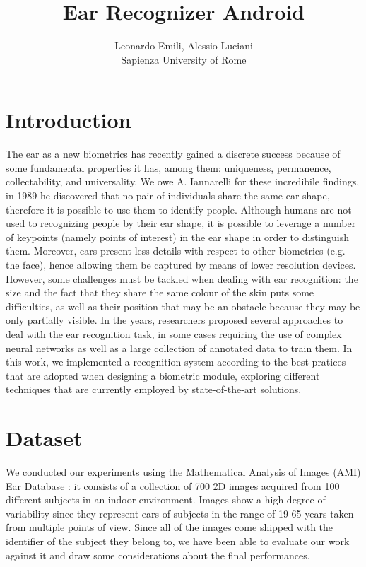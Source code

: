 \documentclass{article}
\begin{document}
\title{Ear Recognizer Android}
\author{Leonardo Emili, Alessio Luciani\\
Sapienza University of Rome}
\renewcommand{\today}{February, 2021}
\maketitle

\section{Introduction}

The ear as a new biometrics has recently gained a discrete success because of some fundamental properties it has,
among them: uniqueness, permanence, collectability, and universality.
We owe A. Iannarelli for these incredibile findings, in 1989 he discovered that no pair of individuals
share the same ear shape, therefore it is possible to use them to identify people. Although humans are
not used to recognizing people by their ear shape, it is possible to leverage a number of keypoints
(namely points of interest) in the ear shape in order to distinguish them. Moreover, ears present
less details with respect to other biometrics (e.g. the face), hence allowing them be captured by
means of lower resolution devices. However, some challenges must be tackled when dealing with ear
recognition: the size and the fact that they share the same colour of the skin puts some difficulties,
as well as their position that may be an obstacle because they may be only partially visible.
In the years, researchers proposed several approaches to deal with the ear recognition task, in some
cases requiring the use of complex neural networks as well as a large collection of annotated data
to train them. In this work, we implemented a recognition system according to the best pratices that
are adopted when designing a biometric module, exploring different techniques that are currently employed
by state-of-the-art solutions.

\section{Dataset}

We conducted our experiments using the Mathematical Analysis of Images (AMI) Ear Database \cite{ami}: it consists
of a collection of 700 2D images acquired from 100 different subjects in an indoor environment.
Images show a high degree of variability since they represent ears of subjects in the range of 19-65 years
taken from multiple points of view. Since all of the images come shipped with the identifier of the subject
they belong to, we have been able to evaluate our work against it and draw some considerations
about the final performances.
\end{document}
